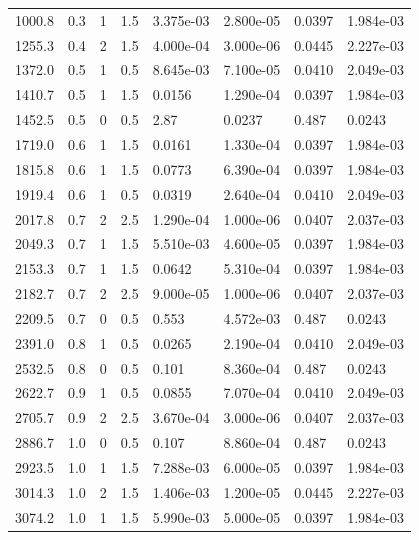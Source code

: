\documentclass[preview]{standalone}
\begin{document}
{{\begin{tabular}{L{1.2cm}C{1.2cm} C{0.3cm}C{0.5cm} C{1.4cm}C{1.4cm} C{1.4cm}C{1.4cm}}
  1000.8  &   0.3  & 1     & 1.5 &  3.375e-03  & 2.800e-05  & 0.0397 &  1.984e-03   \\ 
  1255.3  &   0.4  & 2     & 1.5 &  4.000e-04  & 3.000e-06  & 0.0445 &  2.227e-03   \\ 
  1372.0  &   0.5  & 1     & 0.5 &  8.645e-03  & 7.100e-05  & 0.0410 &  2.049e-03   \\ 
  1410.7  &   0.5  & 1     & 1.5 &  0.0156  & 1.290e-04  & 0.0397 &  1.984e-03   \\ 
  1452.5  &   0.5  & 0     & 0.5 &  2.87  & 0.0237  & 0.487 &  0.0243   \\ 
  1719.0  &   0.6  & 1     & 1.5 &  0.0161  & 1.330e-04  & 0.0397 &  1.984e-03   \\ 
  1815.8  &   0.6  & 1     & 1.5 &  0.0773  & 6.390e-04  & 0.0397 &  1.984e-03   \\ 
  1919.4  &   0.6  & 1     & 0.5 &  0.0319  & 2.640e-04  & 0.0410 &  2.049e-03   \\ 
  2017.8  &   0.7  & 2     & 2.5 &  1.290e-04  & 1.000e-06  & 0.0407 &  2.037e-03   \\ 
  2049.3  &   0.7  & 1     & 1.5 &  5.510e-03  & 4.600e-05  & 0.0397 &  1.984e-03   \\ 
  2153.3  &   0.7  & 1     & 1.5 &  0.0642  & 5.310e-04  & 0.0397 &  1.984e-03   \\ 
  2182.7  &   0.7  & 2     & 2.5 &  9.000e-05  & 1.000e-06  & 0.0407 &  2.037e-03   \\ 
  2209.5  &   0.7  & 0     & 0.5 &  0.553  & 4.572e-03  & 0.487 &  0.0243   \\ 
  2391.0  &   0.8  & 1     & 0.5 &  0.0265  & 2.190e-04  & 0.0410 &  2.049e-03   \\ 
  2532.5  &   0.8  & 0     & 0.5 &  0.101  & 8.360e-04  & 0.487 &  0.0243   \\ 
  2622.7  &   0.9  & 1     & 0.5 &  0.0855  & 7.070e-04  & 0.0410 &  2.049e-03   \\ 
  2705.7  &   0.9  & 2     & 2.5 &  3.670e-04  & 3.000e-06  & 0.0407 &  2.037e-03   \\ 
  2886.7  &   1.0  & 0     & 0.5 &  0.107  & 8.860e-04  & 0.487 &  0.0243   \\ 
  2923.5  &   1.0  & 1     & 1.5 &  7.288e-03  & 6.000e-05  & 0.0397 &  1.984e-03   \\ 
  3014.3  &   1.0  & 2     & 1.5 &  1.406e-03  & 1.200e-05  & 0.0445 &  2.227e-03   \\ 
  3074.2  &   1.0  & 1     & 1.5 &  5.990e-03  & 5.000e-05  & 0.0397 &  1.984e-03   \\ 

\end{tabular}}}
\end{document}
